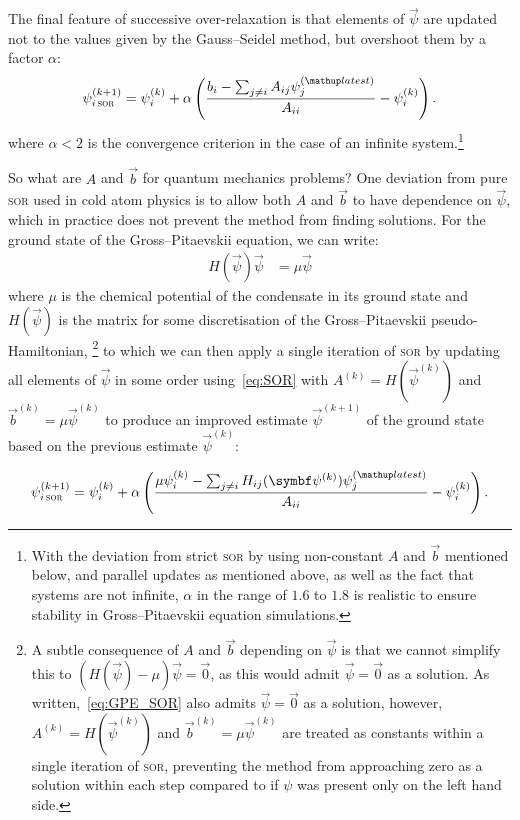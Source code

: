 The final feature of successive over-relaxation is that elements of $\vec\psi$ are updated not to the values given by the Gauss--Seidel method, but overshoot them by a factor $\alpha$:
\begin{align}\label{eq:SOR}
\psi^{(k+1)}_{i\,\textsc{sor}} = \psi^{(k)}_i + \alpha\left(\frac{b_i - \sum_{j\neq i} A_{ij}\psi^{(\up{latest})}_j}{A_{ii}} - \psi^{(k)}_i\right).
\end{align}
where $\alpha < 2$ is the convergence criterion in the case of an infinite system.\footnote{With the deviation from strict \textsc{sor} by using non-constant $A$ and $\vec b$ mentioned below, and parallel updates as mentioned above, as well as the fact that systems are not infinite, $\alpha$ in the range of $1.6$ to $1.8$ is realistic to ensure stability in Gross--Pitaevskii equation simulations.}

So what are $A$ and $\vec b$ for quantum mechanics problems? One deviation from pure \textsc{sor} used in cold atom physics is to allow both $A$ and $\vec b$ to have dependence on $\vec\psi$, which in practice does not prevent the method from finding solutions. For the ground state of the Gross--Pitaevskii equation, we can write:
\begin{align}\label{eq:GPE_SOR}
H(\vec\psi)\vec \psi &= \mu\vec \psi
\end{align}
where $\mu$ is the chemical potential of the condensate in its ground state and $H(\vec\psi)$ is the matrix for some discretisation of the Gross--Pitaevskii pseudo-Hamiltonian,
\footnote{A subtle consequence of $A$ and $\vec b$ depending on $\vec\psi$ is that we cannot simplify this to $(H(\vec\psi) - \mu)\vec \psi = \vec0$, as this would admit $\vec\psi=\vec0$ as a solution. As written,~\eqref{eq:GPE_SOR} also admits $\vec\psi=\vec0$ as a solution, however, $A^{(k)} = H(\vec\psi^{(k)})$ and $\vec b^{(k)} = \mu\vec\psi^{(k)}$ are treated as constants within a single iteration of \textsc{sor}, preventing the method from approaching zero as a solution within each step compared to if $\psi$ was present only on the left hand side.}
 to which we can then apply a single iteration of \textsc{sor} by updating all elements of $\vec\psi$ in some order using~\eqref{eq:SOR} with $A^{(k)} = H(\vec\psi^{(k)})$ and $\vec b^{(k)} = \mu\vec\psi^{(k)}$ to produce an improved estimate $\vec\psi^{(k+1)}$ of the ground state based on the previous estimate $\vec\psi^{(k)}$:

\begin{align}\label{eq:SOR_GPE}
\psi^{(k+1)}_{i\,\textsc{sor}} = \psi^{(k)}_i + \alpha\left(\frac{\mu\psi^{(k)}_i - \sum_{j\neq i} H_{ij}(\vec\psi^{(k)})\psi^{(\up{latest})}_j}{A_{ii}} - \psi^{(k)}_i\right).
\end{align}

